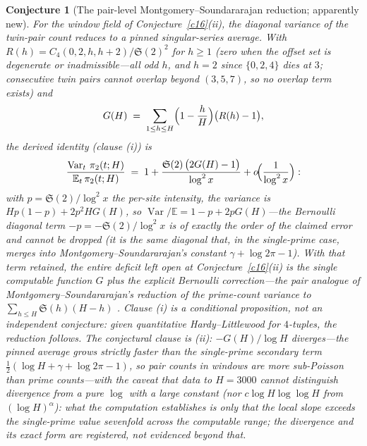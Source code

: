 \documentclass[11pt]{article}
\newtheorem{conjecture}{Conjecture}
\theoremstyle{definition}
\newcommand{\SG}{\mathfrak S}
\begin{document}
\setcounter{conjecture}{1}%
\begin{conjecture}[The pair-level Montgomery--Soundararajan reduction;
apparently new]\label{c12}
For the window field of Conjecture~\ref{c16}(ii), the diagonal
variance of the twin-pair count reduces to a \emph{pinned}
singular-series average.  With
$R(h)=C_4(0,2,h,h+2)/\SG(2)^2$ for $h\ge1$ (zero when the offset set
is degenerate or inadmissible---all odd $h$, and $h=2$ since
$\{0,2,4\}$ dies at $3$; consecutive twin pairs cannot overlap beyond
$(3,5,7)$, so no overlap term exists) and
\[
G(H)\;=\;\sum_{1\le h\le H}\Bigl(1-\frac hH\Bigr)\bigl(R(h)-1\bigr),
\]
the derived identity (clause \emph{(i)}) is
\[
\frac{\operatorname{Var}_t\,\pi_2(t;H)}{\mathbb E_t\,\pi_2(t;H)}
\;=\;1+\frac{\SG(2)\,\bigl(2G(H)-1\bigr)}{\log^2x}
+o\!\Bigl(\frac1{\log^2 x}\Bigr):
\]
with $p=\SG(2)/\log^2x$ the per-site intensity, the variance is
$Hp(1-p)+2p^2HG(H)$, so $\operatorname{Var}/\mathbb E=1-p+2pG(H)$---the Bernoulli diagonal term $-p=-\SG(2)/\log^2x$ is of exactly
the order of the claimed error and cannot be dropped (it is the same
diagonal that, in the single-prime case, merges into
Montgomery--Soundararajan's constant $\gamma+\log2\pi-1$).  With
that term retained, the entire deficit left open at
Conjecture~\ref{c16}(ii) is
the single computable function $G$ plus the explicit Bernoulli
correction---the pair analogue of
Montgomery--Soundararajan's reduction of the prime-count variance to
$\sum_{h\le H}\SG(h)(H-h)$ \cite{MS}.  Clause (i) is a
\emph{conditional proposition}, not an independent conjecture: given
quantitative Hardy--Littlewood for $4$-tuples, the reduction
follows.  The conjectural clause is (ii): $-G(H)/\log H$ diverges---the pinned average grows strictly faster than the single-prime
secondary term $\tfrac12(\log H+\gamma+\log2\pi-1)$, so pair counts
in windows are more sub-Poisson than prime counts---with the caveat that
data to $H=3000$ cannot distinguish divergence from a pure
$\log$ with a large constant
(nor $c\log H\log\log H$ from $(\log H)^\alpha$): what the
computation \emph{establishes} is only that the local slope exceeds
the single-prime value sevenfold across the computable range; the
divergence and its exact form are registered, not evidenced beyond
that.
\end{conjecture}
\end{document}
